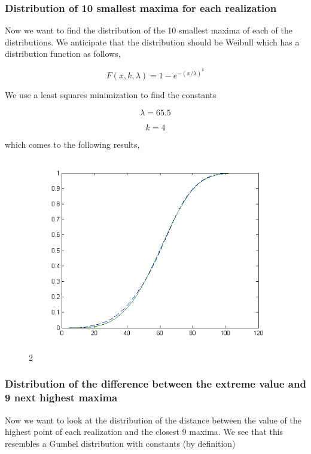 \documentclass[12pt]{article}
\begin{document}
\subsubsection{Distribution of 10 smallest maxima for each realization}

Now we want to find the distribution of the 10 smallest maxima of each of the distributions. We anticipate that the distribution should be Weibull which has a distribution function as follows,

\[F(x,k,\lambda) = 1 - e^{-(x/\lambda)^{k}}\]

We use a least squares minimization to find the constants

\[\lambda = 65.5\]

\[k = 4\]

which comes to the following results,

\begin{figure}[hpt]
	\centering
		\includegraphics[width=1.00\textwidth]{pnR_512_bot10_weibul.png}
	\caption{2}
	\label{fig:pnR_512_bot10_weibul}
\end{figure}

\subsubsection{Distribution of the difference between the extreme value and 9 next highest maxima}

Now we want to look at the distribution of the distance between the value of the highest point of each realization and the closest 9 maxima. We see that this resembles a Gumbel distribution with constants (by definition)
\end{document}
